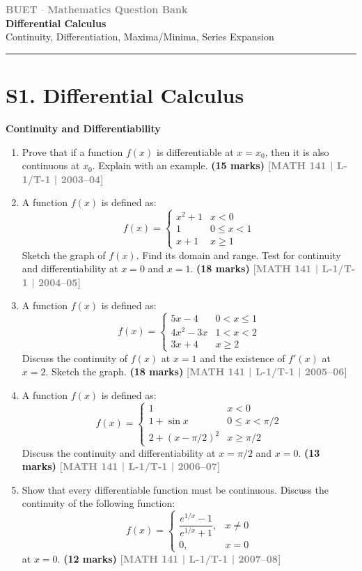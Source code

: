 \documentclass[12pt,a4paper]{article}
\newcommand{\yr}[1]{\hfill\textcolor{gray}{\small\textbf{[#1]}}}
\newcommand{\mk}[1]{\textcolor{orange!70!black}{\small\textbf{(#1 marks)}}}
\newcommand{\subtopic}[2]{%
  \vspace{10pt}
  \noindent\begin{tcolorbox}[colback=#1!8,colframe=#1,boxrule=0.6pt,arc=4pt,
    left=6pt,right=6pt,top=4pt,bottom=4pt]
    \small\bfseries\textcolor{#1}{#2}
  \end{tcolorbox}
  \vspace{2pt}
}
\newcommand{\secdivider}[3]{%
  \newpage\thispagestyle{empty}%
  \vspace*{\fill}%
  \begin{tcolorbox}[enhanced,colback=#3!6,colframe=#3,boxrule=1.5pt,arc=8pt,
    left=20pt,right=20pt,top=22pt,bottom=22pt,
    shadow={3pt}{-3pt}{0pt}{black!15}]
    \centering
    {\large\textcolor{gray}{\textbf{BUET $\cdot$ Mathematics Question Bank}}}\\[8pt]
    {\fontsize{26}{32}\selectfont\bfseries\textcolor{#3}{#1}}\\[6pt]
    {\fontsize{15}{19}\selectfont\textcolor{dgray}{#2}}\\[12pt]
    \textcolor{#3!60}{\rule{0.5\textwidth}{0.5pt}}
  \end{tcolorbox}%
  \vspace*{\fill}\newpage%
}
\begin{document}
\newpage
\secdivider{Differential Calculus}{Continuity, Differentiation, Maxima/Minima, Series Expansion}{cA}

\section{S1. Differential Calculus}
\label{sec:S1}

\subtopic{cA}{Continuity and Differentiability}
\label{sub:s1-cont}

\begin{enumerate}

\item Prove that if a function $f(x)$ is differentiable at $x=x_{0}$, then it is also continuous at $x_{0}$. Explain with an example.
\mk{15} \yr{MATH 141 | L-1/T-1 | 2003--04}

\item A function $f(x)$ is defined as:
\[
f(x)=\begin{cases}x^{2}+1 & x<0\\ 1 & 0\le x<1\\ x+1 & x\ge 1\end{cases}
\]
Sketch the graph of $f(x)$. Find its domain and range. Test for continuity and differentiability at $x=0$ and $x=1$.
\mk{18} \yr{MATH 141 | L-1/T-1 | 2004--05}

\item A function $f(x)$ is defined as:
\[
f(x)=\begin{cases}5x-4 & 0<x\le 1\\ 4x^{2}-3x & 1<x<2\\ 3x+4 & x\ge 2\end{cases}
\]
Discuss the continuity of $f(x)$ at $x=1$ and the existence of $f'(x)$ at $x=2$. Sketch the graph.
\mk{18} \yr{MATH 141 | L-1/T-1 | 2005--06}

\item A function $f(x)$ is defined as:
\[
f(x)=\begin{cases}1 & x<0\\ 1+\sin x & 0\le x<\pi/2\\ 2+(x-\pi/2)^{2} & x\ge\pi/2\end{cases}
\]
Discuss the continuity and differentiability at $x=\pi/2$ and $x=0$.
\mk{13} \yr{MATH 141 | L-1/T-1 | 2006--07}

\item Show that every differentiable function must be continuous. Discuss the continuity of the following function:
\[
f(x)=\begin{cases}\dfrac{e^{1/x}-1}{e^{1/x}+1}, & x\neq 0\\[6pt] 0, & x=0\end{cases}
\]
at $x=0$.
\mk{12} \yr{MATH 141 | L-1/T-1 | 2007--08}


\end{enumerate}
\end{document}
